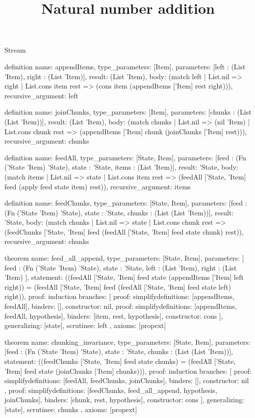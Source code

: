 \begin{lexlean}{Stream}
\title{Natural number addition}
\begin{semanticmodule}
definition{
  name: appendItems,
  type_parameters: [Item],
  parameters: [left : (List 'Item), right : (List 'Item)],
  result: (List 'Item),
  body: (match left
    | List.nil => right
    | List.cons item rest => (cons item (appendItems ['Item] rest right))),
  recursive_argument: left
}

definition{
  name: joinChunks,
  type_parameters: [Item],
  parameters: [chunks : (List (List 'Item))],
  result: (List 'Item),
  body: (match chunks
    | List.nil => (nil 'Item)
    | List.cons chunk rest => (appendItems ['Item] chunk (joinChunks ['Item] rest))),
  recursive_argument: chunks
}

definition{
  name: feedAll,
  type_parameters: [State, Item],
  parameters: [feed : (Fn ('State 'Item) 'State), state : 'State, items : (List 'Item)],
  result: 'State,
  body: (match items
    | List.nil => state
    | List.cons item rest => (feedAll ['State, 'Item] feed (apply feed state item) rest)),
  recursive_argument: items
}

definition{
  name: feedChunks,
  type_parameters: [State, Item],
  parameters: [feed : (Fn ('State 'Item) 'State), state : 'State, chunks : (List (List 'Item))],
  result: 'State,
  body: (match chunks
    | List.nil => state
    | List.cons chunk rest => (feedChunks ['State, 'Item] feed (feedAll ['State, 'Item] feed state chunk) rest)),
  recursive_argument: chunks
}

theorem{
  name: feed_all_append,
  type_parameters: [State, Item],
  parameters: [
    feed : (Fn ('State 'Item) 'State),
    state : 'State,
    left : (List 'Item),
    right : (List 'Item)
  ],
  statement: ((feedAll ['State, 'Item] feed state (appendItems ['Item] left right)) = (feedAll ['State, 'Item] feed (feedAll ['State, 'Item] feed state left) right)),
  proof: induction{
    branches: [
      {proof: simplify{definitions: [appendItems, feedAll]}, binders: [], constructor: nil},
      {
        proof: simplify{definitions: [appendItems, feedAll, hypothesis]},
        binders: [item, rest, hypothesis],
        constructor: cons
      }
    ],
    generalizing: [state],
    scrutinee: left
  },
  axioms: [propext]
}

theorem{
  name: chunking_invariance,
  type_parameters: [State, Item],
  parameters: [feed : (Fn ('State 'Item) 'State), state : 'State, chunks : (List (List 'Item))],
  statement: ((feedChunks ['State, 'Item] feed state chunks) = (feedAll ['State, 'Item] feed state (joinChunks ['Item] chunks))),
  proof: induction{
    branches: [
      {
        proof: simplify{definitions: [feedAll, feedChunks, joinChunks]},
        binders: [],
        constructor: nil
      },
      {
        proof: simplify{definitions: [feedChunks, feed_all_append, hypothesis, joinChunks]},
        binders: [chunk, rest, hypothesis],
        constructor: cons
      }
    ],
    generalizing: [state],
    scrutinee: chunks
  },
  axioms: [propext]
}
\end{semanticmodule}
\end{lexlean}
